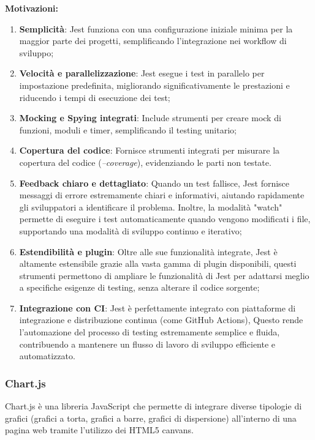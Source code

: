 \textbf{Motivazioni:}
\begin{enumerate}
    \item \textbf{Semplicità}: Jest funziona con una configurazione iniziale minima per la maggior parte dei progetti, semplificando l'integrazione nei workflow di sviluppo;
    \item \textbf{Velocità e parallelizzazione}: Jest esegue i test in parallelo per impostazione predefinita, migliorando significativamente le prestazioni e riducendo i tempi di esecuzione dei test;
    \item \textbf{Mocking e Spying integrati}: Include strumenti per creare mock di funzioni, moduli e timer, semplificando il testing unitario;
    \item \textbf{Copertura del codice}: Fornisce strumenti integrati per misurare la copertura del codice (\textit{--coverage}), evidenziando le parti non testate.
    \item \textbf{Feedback chiaro e dettagliato}: Quando un test fallisce, Jest fornisce messaggi di errore estremamente chiari e informativi, aiutando rapidamente gli sviluppatori a identificare il problema.
    Inoltre, la modalità "watch" permette di eseguire i test automaticamente quando vengono modificati i file, supportando una modalità di sviluppo continuo e iterativo;
    \item \textbf{Estendibilità e plugin}: Oltre alle sue funzionalità integrate, Jest è altamente estensibile grazie alla vasta gamma di plugin disponibili, questi strumenti permettono di ampliare le funzionalità di Jest per adattarsi meglio a specifiche esigenze di testing, senza alterare il codice sorgente;
    \item \textbf{Integrazione con CI}: Jest è perfettamente integrato con piattaforme di integrazione e distribuzione continua (come GitHub Actions), Questo rende l’automazione del processo di testing estremamente semplice e fluida, contribuendo a mantenere un flusso di lavoro di sviluppo efficiente e automatizzato.
\end{enumerate}

\subsubsection{Chart.js}
\label{subsubsec:chart}
Chart.js è una libreria JavaScript che permette di integrare diverse tipologie di grafici (grafici a torta, grafici a barre, grafici di dispersione) all'interno di una pagina web tramite l'utilizzo dei HTML5 canvans.\\

